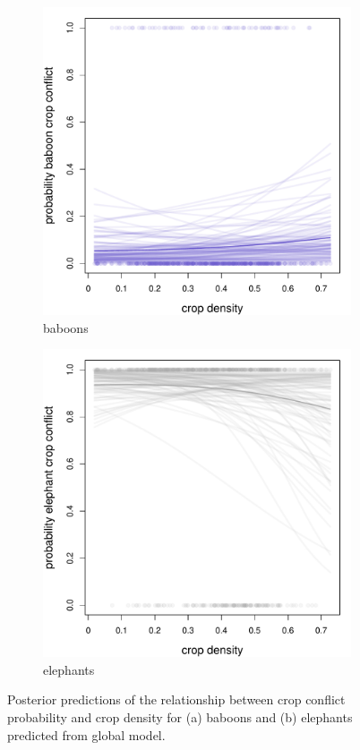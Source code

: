 \documentclass[12pt,]{article}
\begin{document}
\begin{figure}[H]
  \centering
	\begin{subfigure}[b]{0.49\textwidth}
	\includegraphics[width=\textwidth]{Figures/crop_dens_crop_global_conflict_bab.pdf} 
    \caption{baboons}
   	    \label{fig:cropCRbab}
\end{subfigure}
\begin{subfigure}[b]{0.49\textwidth}
	\includegraphics[width=\textwidth]{Figures/crop_dens_crop_global_conflict_ele.pdf}  
    \caption{elephants}
  	\label{fig:cropCRele}
\end{subfigure}
\caption{Posterior predictions of the relationship between crop conflict probability and crop density for (a) baboons and (b) elephants predicted from global model.}
\end{figure}
\end{document}

